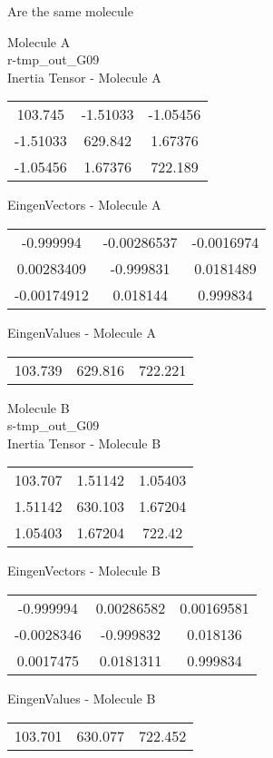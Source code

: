 \begin{center}
\vtab
\vtab
\textcolor{NavyBlue}{\Large Are the same molecule}
\end{center}
\newpage
\begin{multicols}{2}
\begin{center}
Molecule A \\ 
r-tmp\_out\_G09
\\
Inertia Tensor - Molecule A \\
\vtab
\begin{tabular}{|c c c|}
103.745	 & 	-1.51033	 & 	-1.05456	 \\
-1.51033	 & 	629.842	 & 	1.67376	 \\
-1.05456	 & 	1.67376	 & 	722.189
\end{tabular}

\vtab
 EingenVectors - Molecule A     \\
\vtab
\begin{tabular}{|c c c|}
-0.999994	 & 	-0.00286537	 & 	-0.0016974	 \\
0.00283409	 & 	-0.999831	 & 	0.0181489	 \\
-0.00174912	 & 	0.018144	 & 	0.999834
\end{tabular}

\vtab
 EingenValues - Molecule A     \\
\vtab
\begin{tabular}{|c c c|}
103.739	 & 	629.816	 & 	722.221
\end{tabular}
\columnbreak

Molecule B \\ 
s-tmp\_out\_G09
\\
Inertia Tensor - Molecule B \\
\vtab
\begin{tabular}{|c c c|}
103.707	 & 	1.51142	 & 	1.05403	 \\
1.51142	 & 	630.103	 & 	1.67204	 \\
1.05403	 & 	1.67204	 & 	722.42
\end{tabular}

\vtab
 EingenVectors - Molecule B     \\
\vtab
\begin{tabular}{|c c c|}
-0.999994	 & 	0.00286582	 & 	0.00169581	 \\
-0.0028346	 & 	-0.999832	 & 	0.018136	 \\
0.0017475	 & 	0.0181311	 & 	0.999834
\end{tabular}

\vtab
 EingenValues - Molecule B     \\
\vtab
\begin{tabular}{|c c c|}
103.701	 & 	630.077	 & 	722.452
\end{tabular}

\end{center}
\end{multicols}
